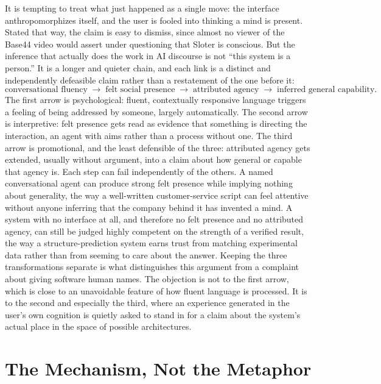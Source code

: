 \documentclass[11pt]{article}
\begin{document}
It is tempting to treat what just happened as a single move: the interface anthropomorphizes itself, and the user is fooled into thinking a mind is present. Stated that way, the claim is easy to dismiss, since almost no viewer of the Base44 video would assert under questioning that Sloter is conscious. But the inference that actually does the work in AI discourse is not ``this system is a person.'' It is a longer and quieter chain, and each link is a distinct and independently defeasible claim rather than a restatement of the one before it:
\[
\text{conversational fluency}
\;\longrightarrow\;
\text{felt social presence}
\;\longrightarrow\;
\text{attributed agency}
\;\longrightarrow\;
\text{inferred general capability.}
\]
The first arrow is psychological: fluent, contextually responsive language triggers a feeling of being addressed by someone, largely automatically. The second arrow is interpretive: felt presence gets read as evidence that something is directing the interaction, an agent with aims rather than a process without one. The third arrow is promotional, and the least defensible of the three: attributed agency gets extended, usually without argument, into a claim about how general or capable that agency is. Each step can fail independently of the others. A named conversational agent can produce strong felt presence while implying nothing about generality, the way a well-written customer-service script can feel attentive without anyone inferring that the company behind it has invented a mind. A system with no interface at all, and therefore no felt presence and no attributed agency, can still be judged highly competent on the strength of a verified result, the way a structure-prediction system earns trust from matching experimental data rather than from seeming to care about the answer. Keeping the three transformations separate is what distinguishes this argument from a complaint about giving software human names. The objection is not to the first arrow, which is close to an unavoidable feature of how fluent language is processed. It is to the second and especially the third, where an experience generated in the user's own cognition is quietly asked to stand in for a claim about the system's actual place in the space of possible architectures.

\section{The Mechanism, Not the Metaphor}
\label{sec:mechanism}
\end{document}
